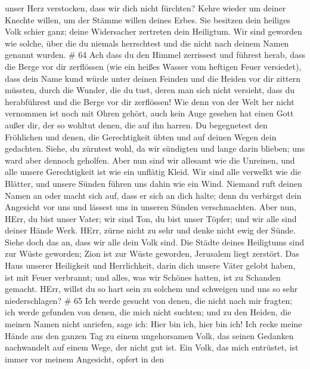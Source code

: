 unser Herz verstocken, dass wir dich nicht fürchten? Kehre wieder um
deiner Knechte willen, um der Stämme willen deines Erbes. 
Sie besitzen dein heiliges Volk schier ganz; deine Widersacher zertreten
dein Heiligtum.  Wir sind geworden wie solche, über die du
niemals herrschtest und die nicht nach deinem Namen genannt wurden. \#
64  Ach dass du den Himmel zerrissest und führest herab,
dass die Berge vor dir zerflössen (wie ein heißes Wasser vom heftigen
Feuer versiedet), dass dein Name kund würde unter deinen Feinden und die
Heiden vor dir zittern müssten,  durch die Wunder, die du
tust, deren man sich nicht versieht, dass du herabführest und die Berge
vor dir zerflössen!  Wie denn von der Welt her nicht
vernommen ist noch mit Ohren gehört, auch kein Auge gesehen hat einen
Gott außer dir, der so wohltut denen, die auf ihn harren. 
Du begegnetest den Fröhlichen und denen, die Gerechtigkeit übten und auf
deinen Wegen dein gedachten. Siehe, du zürntest wohl, da wir sündigten
und lange darin blieben; uns ward aber dennoch geholfen. 
Aber nun sind wir allesamt wie die Unreinen, und alle unsere
Gerechtigkeit ist wie ein unflätig Kleid. Wir sind alle verwelkt wie die
Blätter, und unsere Sünden führen uns dahin wie ein Wind. 
Niemand ruft deinen Namen an oder macht sich auf, dass er sich an dich
halte; denn du verbirgst dein Angesicht vor uns und lässest uns in
unseren Sünden verschmachten.  Aber nun, HErr, du bist unser
Vater; wir sind Ton, du bist unser Töpfer; und wir alle sind deiner
Hände Werk.  HErr, zürne nicht zu sehr und denke nicht ewig
der Sünde. Siehe doch das an, dass wir alle dein Volk sind. 
Die Städte deines Heiligtums sind zur Wüste geworden; Zion ist zur Wüste
geworden, Jerusalem liegt zerstört.  Das Haus unserer
Heiligkeit und Herrlichkeit, darin dich unsere Väter gelobt haben, ist
mit Feuer verbrannt; und alles, was wir Schönes hatten, ist zu Schanden
gemacht.  HErr, willst du so hart sein zu solchem und
schweigen und uns so sehr niederschlagen? \# 65  Ich werde
gesucht von denen, die nicht nach mir fragten; ich werde gefunden von
denen, die mich nicht suchten; und zu den Heiden, die meinen Namen nicht
anriefen, sage ich: Hier bin ich, hier bin ich!  Ich recke
meine Hände aus den ganzen Tag zu einem ungehorsamen Volk, das seinen
Gedanken nachwandelt auf einem Wege, der nicht gut ist.  Ein
Volk, das mich entrüstet, ist immer vor meinem Angesicht, opfert in den

